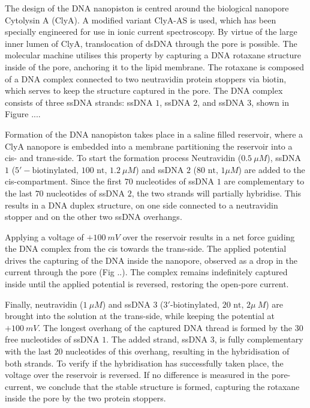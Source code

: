 The design of the DNA nanopiston is centred around the biological nanopore Cytolysin
A (ClyA). A modified variant ClyA-AS is used, which has been specially engineered for
use in ionic current spectroscopy.\cite{Soskine2012} By virtue of the large inner lumen
of ClyA,
translocation of dsDNA through the pore is possible. The molecular machine utilises this
property by capturing a DNA rotaxane structure inside of the pore, anchoring it to the
lipid membrane. The rotaxane is composed of a DNA complex connected to two neutravidin
protein stoppers via biotin, which serves to keep the structure captured in the pore. The
DNA complex consists of three ssDNA strands: ssDNA $1$, ssDNA $2$, and ssDNA $3$, shown
in Figure ....

Formation of the DNA nanopiston takes place in a saline filled reservoir, where a
ClyA nanopore is embedded into a membrane partitioning the reservoir into a cis- and
trans-side. To start the formation process Neutravidin ($0.5\ \mu M$), ssDNA $1$
($5′-\text{biotinylated, }100\text{ nt, }1.2\ \mu M$) and ssDNA $2$ ($80\text{ nt, }1
\mu M$) are added to the cis-compartment. Since the first $70$ nucleotides of ssDNA $1$
are complementary to the last $70$ nucleotides of ssDNA $2$, the two strands will
partially hybridise. This results in a DNA duplex structure, on one side connected to a
neutravidin stopper and on the other two ssDNA overhangs.

Applying a voltage of $+100\ mV$ over the reservoir results in a net force guiding the
DNA complex from the cis towards the trans-side. The applied potential drives the
capturing of the DNA inside the nanopore, observed as a drop in the current through the
pore (Fig ..). The complex remains indefinitely captured inside until the
applied potential is reversed, restoring the open-pore current.

Finally, neutravidin ($1\ \mu M$) and ssDNA $3$ ($3\text{′-biotinylated, }20\text{ nt, }2
\mu\ M$) are brought into the solution at the trans-side, while keeping the potential at
$+ 100\ mV$. The longest overhang of the captured DNA thread is formed by the 30 free
nucleotides of ssDNA $1$. The added strand, ssDNA $3$, is fully complementary with the
last $20$ nucleotides of this overhang, resulting in the hybridisation of both strands.
To verify if the hybridisation has successfully taken place, the voltage over the
reservoir is reversed. If no difference is measured in the pore-current, we conclude that
the stable structure is formed, capturing the rotaxane inside the pore by the two protein
stoppers.

